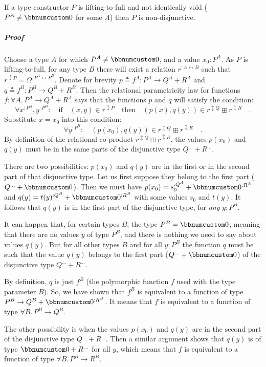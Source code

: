 If a type constructor $P$ is lifting-to-full and not identically
void ($P^{A}\neq\bbnum 0$ for some $A$) then $P$ is non-disjunctive.

\subparagraph{Proof}

Choose a type $A$ for which $P^{A}\neq\bbnum 0$, and a value $x_{0}:P^{A}$.
As $P$ is lifting-to-full, for any type $B$ there will exist a relation
$r^{:A\leftrightarrow B}$ such that $r^{\updownarrow P}=\Omega^{:P^{A}\leftrightarrow P^{B}}$.
Denote for brevity $p\triangleq f^{A}:P^{A}\rightarrow Q^{A}+R^{A}$
and $q\triangleq f^{B}:P^{B}\rightarrow Q^{B}+R^{B}$. Then the relational
parametricity law for functions $f:\forall A.\,P^{A}\rightarrow Q^{A}+R^{A}$
says that the functions $p$ and $q$ will satisfy the condition:
\[
\forall x^{:P^{A}},y^{:P^{B}}:\quad\text{if}\quad(x,y)\in r^{\updownarrow P}\quad\text{then}\quad(p(x),q(y))\in r^{\updownarrow Q}\boxplus r^{\updownarrow R}\quad.
\]
Substitute $x=x_{0}$ into this condition:
\[
\forall y^{:P^{B}}:\quad(p(x_{0}),q(y))\in r^{\updownarrow Q}\boxplus r^{\updownarrow R}\quad.
\]
By definition of the relational co-product $r^{\updownarrow Q}\boxplus r^{\updownarrow R}$,
the values $p(x_{0})$ and $q(y)$ must be in the same parts of the
disjunctive type $Q^{...}+R^{...}$. 

There are two possibilities: $p(x_{0})$ and $q(y)$ are in the first
or in the second part of that disjunctive type. Let us first suppose
they belong to the first part ($Q^{...}+\bbnum 0$). Then we must
have $p(x_{0})=s_{0}^{:Q^{A}}+\bbnum 0^{:R^{A}}$ and $q(y)=t(y)^{:Q^{B}}+\bbnum 0^{:R^{B}}$
with some values $s_{0}$ and $t(y)$. It follows that $q(y)$ is
in the first part of the disjunctive type, for \emph{any} $y:P^{B}$. 

It can happen that, for certain types $B$, the type $P^{B}=\bbnum 0$,
meaning that there are no values $y$ of type $P^{B}$, and there
is nothing we need to say about values $q(y)$. But for all other
types $B$ and for all $y:P^{B}$ the function $q$ must be such that
the value $q(y)$ belongs to the first part ($Q^{...}+\bbnum 0$)
of the disjunctive type $Q^{...}+R^{...}$.

By definition, $q$ is just $f^{B}$ (the polymorphic function $f$
used with the type parameter $B$). So, we have shown that $f^{B}$
is equivalent to a function of type $P^{B}\rightarrow Q^{B}+\bbnum 0^{:R^{B}}$.
It means that $f$ is equivalent to a function of type $\forall B.\,P^{B}\rightarrow Q^{B}$.

The other possibility is when the values $p(x_{0})$ and $q(y)$ are
in the second part of the disjunctive type $Q^{...}+R^{...}$. Then
a similar argument shows that $q(y)$ is of type $\bbnum 0+R^{...}$
for all $y$, which means that $f$ is equivalent to a function of
type $\forall B.\,P^{B}\rightarrow R^{B}$.

